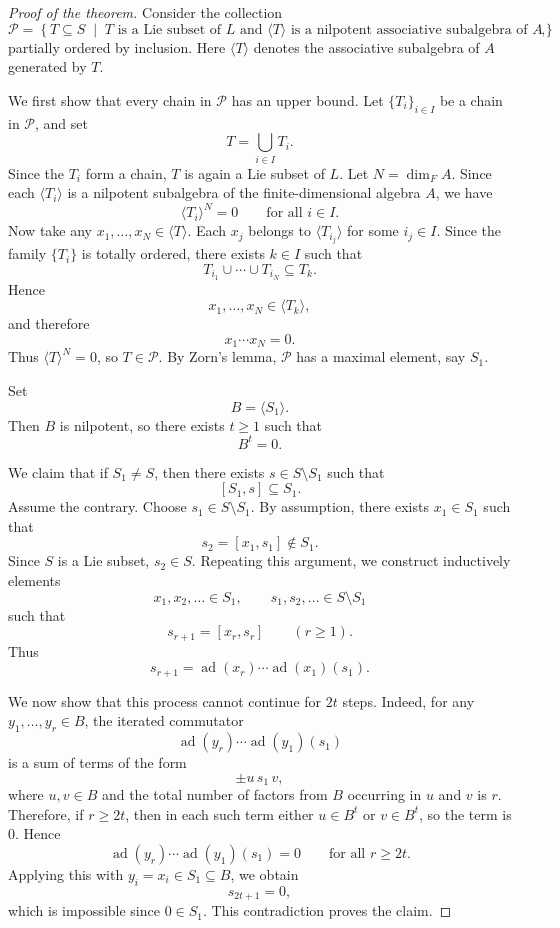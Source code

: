 \begin{proof}[Proof of the theorem]
    Consider the collection
    \[
        \mathcal P=
        \left\{
        T\subseteq S
        \;\middle|\;
        T \text{ is a Lie subset of }L
        \text{ and }
        \langle T\rangle \text{ is a nilpotent associative subalgebra of }A
        \right\},
    \]
    partially ordered by inclusion. Here $\langle T\rangle$ denotes the associative subalgebra of $A$
    generated by $T$.

    We first show that every chain in $\mathcal P$ has an upper bound. Let $\{T_i\}_{i\in I}$ be a chain
    in $\mathcal P$, and set
    \[
        T=\bigcup_{i\in I}T_i.
    \]
    Since the $T_i$ form a chain, $T$ is again a Lie subset of $L$. Let $N=\dim_F A$. Since each
    $\langle T_i\rangle$ is a nilpotent subalgebra of the finite-dimensional algebra $A$, we have
    \[
        \langle T_i\rangle^N=0
        \qquad
        \text{for all }i\in I.
    \]
    Now take any $x_1,\dots,x_N\in \langle T\rangle$. Each $x_j$ belongs to $\langle T_{i_j}\rangle$
    for some $i_j\in I$. Since the family $\{T_i\}$ is totally ordered, there exists $k\in I$ such that
    \[
        T_{i_1}\cup\cdots\cup T_{i_N}\subseteq T_k.
    \]
    Hence
    \[
        x_1,\dots,x_N\in \langle T_k\rangle,
    \]
    and therefore
    \[
        x_1\cdots x_N=0.
    \]
    Thus $\langle T\rangle^N=0$, so $T\in\mathcal P$. By Zorn's lemma, $\mathcal P$ has a maximal
    element, say $S_1$.

    Set
    \[
        B=\langle S_1\rangle.
    \]
    Then $B$ is nilpotent, so there exists $t\ge 1$ such that
    \[
        B^t=0.
    \]

    We claim that if $S_1\ne S$, then there exists $s\in S\setminus S_1$ such that
    \[
        [S_1,s]\subseteq S_1.
    \]
    Assume the contrary. Choose $s_1\in S\setminus S_1$. By assumption, there exists $x_1\in S_1$ such that
    \[
        s_2=[x_1,s_1]\notin S_1.
    \]
    Since $S$ is a Lie subset, $s_2\in S$. Repeating this argument, we construct inductively elements
    \[
        x_1,x_2,\dots \in S_1,
        \qquad
        s_1,s_2,\dots \in S\setminus S_1
    \]
    such that
    \[
        s_{r+1}=[x_r,s_r]
        \qquad
        (r\ge 1).
    \]
    Thus
    \[
        s_{r+1}=\operatorname{ad}(x_r)\cdots \operatorname{ad}(x_1)(s_1).
    \]

    We now show that this process cannot continue for $2t$ steps. Indeed, for any $y_1,\dots,y_r\in B$,
    the iterated commutator
    \[
        \operatorname{ad}(y_r)\cdots \operatorname{ad}(y_1)(s_1)
    \]
    is a sum of terms of the form
    \[
        \pm u\, s_1\, v,
    \]
    where $u,v\in B$ and the total number of factors from $B$ occurring in $u$ and $v$ is $r$.
    Therefore, if $r\ge 2t$, then in each such term either $u\in B^t$ or $v\in B^t$, so the term is $0$.
    Hence
    \[
        \operatorname{ad}(y_r)\cdots \operatorname{ad}(y_1)(s_1)=0
        \qquad
        \text{for all } r\ge 2t.
    \]
    Applying this with $y_i=x_i\in S_1\subseteq B$, we obtain
    \[
        s_{2t+1}=0,
    \]
    which is impossible since $0\in S_1$. This contradiction proves the claim.


\end{proof}
